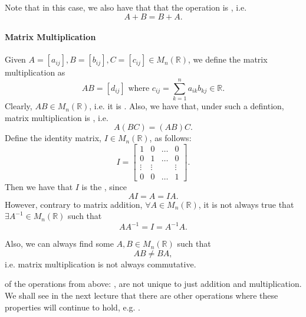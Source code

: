 \documentclass[notoc,notitlepage]{tufte-book}
\begin{document}
Note that in this case, we also have that that the operation is , i.e.
\begin{equation*}
  A + B = B + A.
\end{equation*}

\paragraph{Matrix Multiplication} Given $A = [a_{ij}], B = [b_{ij}], C = [c_{ij}] \in M_n(\mathbb{R})$, we define the matrix multiplication as
\begin{equation*}
  AB = [d_{ij}] \text{ where } c_{ij} = \sum_{k=1}^{n} a_{ik} b_{kj} \in \mathbb{R}.
\end{equation*}
Clearly, $AB \in M_n(\mathbb{R})$, i.e. it is . Also, we have that, under such a defintion, matrix multiplication is , i.e.
\begin{equation*}
  A(BC) = (AB)C.
\end{equation*}
Define the identity matrix, $I \in M_n(\mathbb{R})$, as follows:
\begin{equation*}
  I = \begin{bmatrix}
    1      &   0    & \hdots & 0 \\
    0      &   1    & \hdots & 0 \\
    \vdots & \vdots &        & \vdots \\
    0      &   0    & \hdots & 1
  \end{bmatrix}.
\end{equation*}
Then we have that $I$ is the , since
\begin{equation*}
  AI = A = IA.
\end{equation*}
However, contrary to matrix addition, $\forall A \in M_n(\mathbb{R})$, it is not always true that $\exists A^{-1} \in M_n(\mathbb{R})$ such that
\begin{equation*}
  AA^{-1} = I = A^{-1} A.
\end{equation*}

Also, we can always find some $A, B \in M_n(\mathbb{R})$ such that
\begin{equation*}
  AB \neq BA,
\end{equation*}
i.e. matrix multiplication is not always commutative.

 of the operations from above: , are not unique to just addition and multiplication. We shall see in the next lecture that there are other operations where these properties will continue to hold, e.g. .




\nobibliography*


\printindex
\end{document}

